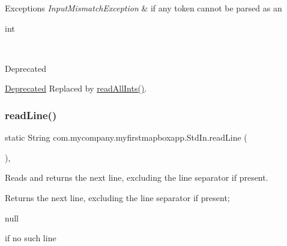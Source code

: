 \begin{DoxyExceptions}{Exceptions}
{\em Input\+Mismatch\+Exception} & if any token cannot be parsed as an
\begin{DoxyCode}
\textcolor{keywordtype}{int} 
\end{DoxyCode}
 \\
\hline
\end{DoxyExceptions}
\begin{DoxyRefDesc}{Deprecated}
\item[\hyperlink{deprecated__deprecated000001}{Deprecated}]Replaced by \hyperlink{classcom_1_1mycompany_1_1myfirstmapboxapp_1_1_std_in_a9e0708b89e6cf2886ba908bc03eae3cb}{read\+All\+Ints()}. \end{DoxyRefDesc}
\mbox{\label{classcom_1_1mycompany_1_1myfirstmapboxapp_1_1_std_in_a0ce2aa1a4c057b28a34bd07c54c45545}} 
\subsubsection{\texorpdfstring{read\+Line()}{readLine()}}
{\footnotesize\ttfamily static String com.\+mycompany.\+myfirstmapboxapp.\+Std\+In.\+read\+Line (\begin{DoxyParamCaption}{ }\end{DoxyParamCaption})\hspace{0.3cm}{\ttfamily [inline]}, {\ttfamily [static]}}

Reads and returns the next line, excluding the line separator if present.

\begin{DoxyReturn}{Returns}
the next line, excluding the line separator if present; 
\begin{DoxyCode}
null 
\end{DoxyCode}
 if no such line 
\end{DoxyReturn}
\mbox{\label{classcom_1_1mycompany_1_1myfirstmapboxapp_1_1_std_in_a0d4385fe7654b65b28f79deb65bb973a}} 
